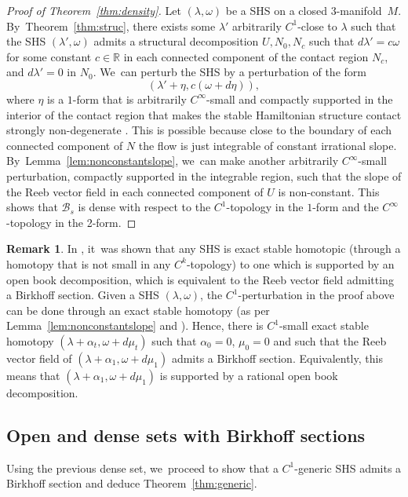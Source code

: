 \documentclass[JEP,XML,SOM,Unicode,NoEqCountersInSection,NoFloatCountersInSection,published]{cedram}
\newcommand{\threemanifold}{$3$\nobreakdash-mani\-fold\xspace}
\theoremstyle{definition}
\newtheorem{Remark}[theorem]{Remark}
\begin{document}
\begin{proof}[Proof of Theorem~\ref{thm:density}]
Let $(\lambda,\omega)$ be a SHS on a closed \threemanifold~$M$. By~Theorem~\ref{thm:struc}, there exists some $\lambda'$ arbitrarily $C^1$-close to $\lambda$ such that the SHS $(\lambda',\omega)$ admits a structural decomposition $U, N_0, N_c$ such that $d\lambda'=c\omega$ for some constant $c\in \mathbb{R}$ in each connected component of the contact region $N_c$, and $d\lambda'=0$ in $N_0$. We~can perturb the SHS by a perturbation of the form
\[
(\lambda'+ \eta, c(\omega+d\eta)),
\]
where $\eta$ is a $1$-form that is arbitrarily $C^\infty$-small and compactly supported in the interior of the contact region that makes the stable Hamiltonian structure contact strongly non-degenerate \cite{CM, Ro, Pe}. This is possible because close to the boundary of each connected component of $N$ the flow is just integrable of constant irrational slope. By~Lemma~\ref{lem:nonconstantslope}, we~can make another arbitrarily $C^\infty$-small perturbation, compactly supported in the integrable region, such that the slope of the Reeb vector field in each connected component of $U$ is non-constant. This shows that $\mathcal{B}_s$ is dense with respect to the $C^1$-topology in the $1$-form and the $C^\infty$-topology in the 2-form.
\end{proof}

\begin{Remark}\label{rm:rat}
In \cite{CV0}, it~was shown that any SHS is exact stable homotopic (through a homotopy that is not small in any $C^k$-topology) to one which is supported by an open book decomposition, which is equivalent to the Reeb vector field admitting a Birkhoff section. Given a SHS $(\lambda, \omega)$, the $C^1$-perturbation in the proof above can be done through an exact stable homotopy (as per Lemma~\ref{lem:nonconstantslope} and \cite[Th.\,4.6]{CV1}). Hence, there is $C^1$-small exact stable homotopy $(\lambda+\alpha_t, \omega+ d\mu_t)$ such that $\alpha_0=0$, $\mu_0=0$ and such that the Reeb vector field of $(\lambda+\alpha_1, \omega+d\mu_1)$ admits a Birkhoff section. Equivalently, this means that $(\lambda+\alpha_1,\omega+d\mu_1)$ is supported by a rational open book decomposition.
\end{Remark}

\subsection{Open and dense sets with Birkhoff sections}
Using the previous dense set, we~proceed to show that a $C^1$-generic SHS admits a Birkhoff section and deduce Theorem~\ref{thm:generic}.
\end{document}
